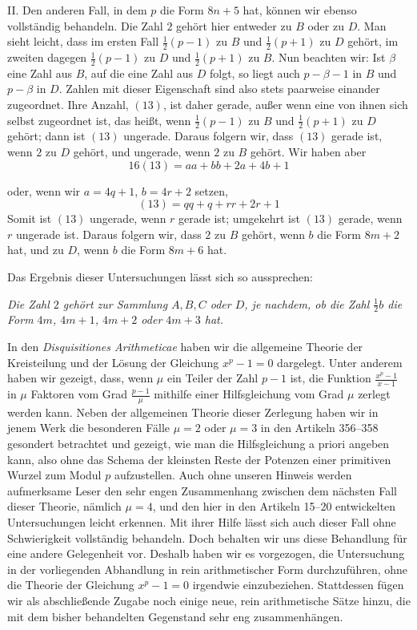 II. Den anderen Fall, in dem $p$ die Form $8n+5$ hat, können wir ebenso vollständig behandeln. Die Zahl $2$ gehört hier entweder zu $B$ oder zu $D$. Man sieht leicht, dass im ersten Fall $\frac12(p-1)$ zu $B$ und $\frac12(p+1)$ zu $D$ gehört, im zweiten dagegen $\frac12(p-1)$ zu $D$ und $\frac12(p+1)$ zu $B$. Nun beachten wir: Ist $\beta$ eine Zahl aus $B$, auf die eine Zahl aus $D$ folgt, so liegt auch $p-\beta-1$ in $B$ und $p-\beta$ in $D$. Zahlen mit dieser Eigenschaft sind also stets paarweise einander zugeordnet. Ihre Anzahl, $(13)$, ist daher gerade, außer wenn eine von ihnen sich selbst zugeordnet ist, das heißt, wenn $\frac12(p-1)$ zu $B$ und $\frac12(p+1)$ zu $D$ gehört; dann ist $(13)$ ungerade. Daraus folgern wir, dass $(13)$ gerade ist, wenn $2$ zu $D$ gehört, und ungerade, wenn $2$ zu $B$ gehört. Wir haben aber
\[
16(13)=aa+bb+2a+4b+1
\]

%
oder, wenn wir $a=4q+1$, $b=4r+2$ setzen,
\[
(13)=qq+q+rr+2r+1
\]
Somit ist $(13)$ ungerade, wenn $r$ gerade ist; umgekehrt ist $(13)$ gerade, wenn $r$ ungerade ist. Daraus folgern wir, dass $2$ zu $B$ gehört, wenn $b$ die Form $8m+2$ hat, und zu $D$, wenn $b$ die Form $8m+6$ hat.

Das Ergebnis dieser Untersuchungen lässt sich so aussprechen:

\emph{Die Zahl $2$ gehört zur Sammlung $A,B,C$ oder $D$, je nachdem, ob die Zahl $\frac12b$ die Form $4m$, $4m+1$, $4m+2$ oder $4m+3$ hat.}

In den \emph{Disquisitiones Arithmeticae} haben wir die allgemeine Theorie der Kreisteilung und der Lösung der Gleichung $x^p-1=0$ dargelegt. Unter anderem haben wir gezeigt, dass, wenn $\mu$ ein Teiler der Zahl $p-1$ ist, die Funktion $\frac{x^p-1}{x-1}$ in $\mu$ Faktoren vom Grad $\frac{p-1}{\mu}$ mithilfe einer Hilfsgleichung vom Grad $\mu$ zerlegt werden kann. Neben der allgemeinen Theorie dieser Zerlegung haben wir in jenem Werk die besonderen Fälle $\mu=2$ oder $\mu=3$ in den Artikeln 356--358 gesondert betrachtet und gezeigt, wie man die Hilfsgleichung a priori angeben kann, also ohne das Schema der kleinsten Reste der Potenzen einer primitiven Wurzel zum Modul $p$ aufzustellen. Auch ohne unseren Hinweis werden aufmerksame Leser den sehr engen Zusammenhang zwischen dem nächsten Fall dieser Theorie, nämlich $\mu=4$, und den hier in den Artikeln 15--20 entwickelten Untersuchungen leicht erkennen. Mit ihrer Hilfe lässt sich auch dieser Fall ohne Schwierigkeit vollständig behandeln. Doch behalten wir uns diese Behandlung für eine andere Gelegenheit vor. Deshalb haben wir es vorgezogen, die Untersuchung in der vorliegenden Abhandlung in rein arithmetischer Form durchzuführen, ohne die Theorie der Gleichung $x^p-1=0$ irgendwie einzubeziehen. Stattdessen fügen wir als abschließende Zugabe noch einige neue, rein arithmetische Sätze hinzu, die mit dem bisher behandelten Gegenstand sehr eng zusammenhängen.
